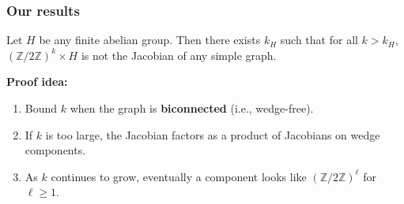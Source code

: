 \documentclass[mathserif, serif, xcolor=dvipsnames]{beamer}
\newcommand{\Z}{\ensuremath{\mathbb{Z}}}
\begin{document}
\begin{frame}
  \frametitle{Our results}
  \begin{theorem}[GWW]
    Let $H$ be any finite abelian group. Then there exists $k_H$ such that for all $k>k_H$, $(\Z/2\Z)^k \times H$ is not the Jacobian of any simple graph. 
  \end{theorem}
  \vspace{0.6cm}

  \pause 

  \textbf{Proof idea:}
  \begin{enumerate}
  \item Bound $k$ when the graph is \textbf{biconnected}
    (i.e., wedge-free).
    \pause
  \item If $k$ is too large, the Jacobian factors as a product of
    Jacobians on wedge components.
    \pause
  \item As $k$ continues to grow, eventually a component looks like
    $(\Z/2\Z)^\ell$ for $\ell \ge 1$.
  \end{enumerate}

\end{frame}
\end{document}
